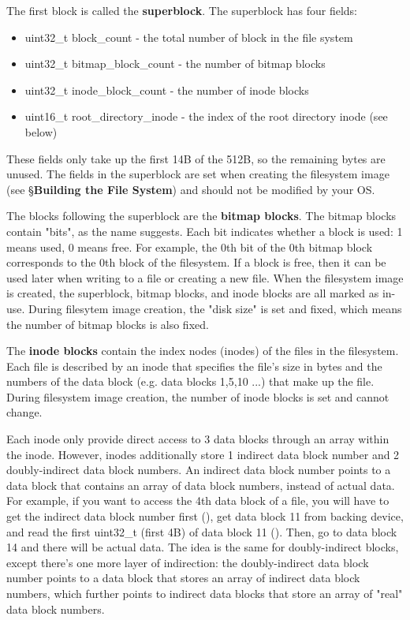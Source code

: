 \documentclass{article}
\begin{document}
The first block is called the \textbf{superblock}. 
The superblock has four fields:
\begin{itemize}
	\item {\fix uint32\_t block\_count} - the total number of block in the file system
	\item {\fix uint32\_t bitmap\_block\_count} - the number of bitmap blocks
	\item {\fix uint32\_t inode\_block\_count} - the number of inode blocks
	\item {\fix uint16\_t root\_directory\_inode} - the index of the root directory inode (see below)
\end{itemize}
These fields only take up the first 14B of the 512B, so the remaining bytes are unused. The fields in the superblock are set
when creating the filesystem image (see \S \textbf{Building the File System}) and should not be modified by your OS.

The blocks following the superblock are the \textbf{bitmap blocks}.
The bitmap blocks contain "bits", as the name suggests.
Each bit indicates whether a block is used: 1 means used, 0 means free.
For example, the 0th bit of the 0th bitmap block corresponds to the 0th block of the filesystem.
If a block is free, then it can be used later when writing to a file or creating a new file.
When the filesystem image is created, the superblock, bitmap blocks, and inode blocks are all marked as in-use.
During filesytem image creation, the "disk size" is set and fixed, which means the number of bitmap blocks is also fixed.

The \textbf{inode blocks} contain the index nodes (inodes) of the files in the filesystem.
Each file is described by an inode that specifies the
file's size in bytes and the numbers of the data block (e.g. data blocks 1,5,10 ...) that make up the file.
During filesystem image creation, the number of inode blocks is set and cannot change.

Each inode only provide direct access to 3 data blocks through an array within the inode.
However, inodes additionally store 1 indirect data block number and 2 doubly-indirect data block numbers.
An indirect data block number points to a data block that contains an array of data block numbers, instead of actual data.
For example, if you want to access the 4th data block of a file, you will have to get the indirect data block number first 
(),
get data block 11 from backing device, and read the first {\fix uint32\_t} (first 4B) of data block 11 ().
Then, go to data block 14 and there will be actual data. The idea is the same for doubly-indirect blocks, except there's
one more layer of indirection: the doubly-indirect data block number points to a data block that stores an array of indirect data block numbers, 
which further points to indirect data blocks that store an array of "real" data block numbers.
\end{document}
